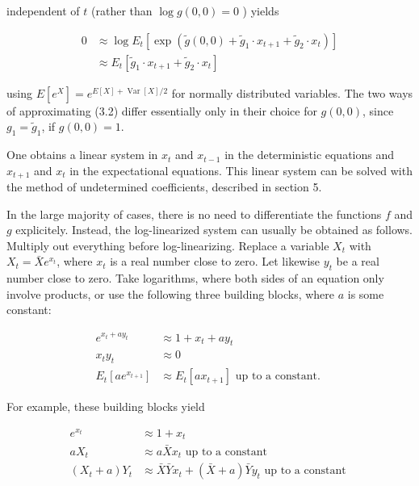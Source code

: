 \documentclass[10pt]{article}
\begin{document}
independent of $t$ (rather than $\log g(0,0)=0$ ) yields

\begin{equation*}
\begin{aligned}
0 & \approx \log E_{t}\left[\exp \left(\tilde{g}(0,0)+\tilde{g}_{1} \cdot x_{t+1}+\tilde{g}_{2} \cdot x_{t}\right)\right] \\
& \approx E_{t}\left[\tilde{g}_{1} \cdot x_{t+1}+\tilde{g}_{2} \cdot x_{t}\right]
\end{aligned}
\end{equation*}

using $E\left[e^{X}\right]=e^{E[X]+\operatorname{Var}[X] / 2}$ for normally distributed variables. The two ways of approximating (3.2) differ essentially only in their choice for $g(0,0)$, since $g_{1}=\tilde{g}_{1}$, if $g(0,0)=1$.

One obtains a linear system in $x_{t}$ and $x_{t-1}$ in the deterministic equations and $x_{t+1}$ and $x_{t}$ in the expectational equations. This linear system can be solved with the method of undetermined coefficients, described in section 5.

In the large majority of cases, there is no need to differentiate the functions $f$ and $g$ explicitely. Instead, the log-linearized system can usually be obtained as follows. Multiply out everything before log-linearizing. Replace a variable $X_{t}$ with $X_{t}=\bar{X} e^{x_{t}}$, where $x_{t}$ is a real number close to zero. Let likewise $y_{t}$ be a real number close to zero. Take logarithms, where both sides of an equation only involve products, or use the following three building blocks, where $a$ is some constant:

\begin{equation*}
\begin{aligned}
e^{x_{t}+a y_{t}} & \approx 1+x_{t}+a y_{t} \\
x_{t} y_{t} & \approx 0 \\
E_{t}\left[a e^{x_{t+1}}\right] & \approx E_{t}\left[a x_{t+1}\right] \text { up to a constant. }
\end{aligned}
\end{equation*}

For example, these building blocks yield

\begin{equation*}
\begin{aligned}
e^{x_{t}} & \approx 1+x_{t} \\
a X_{t} & \approx a \bar{X} x_{t} \text { up to a constant } \\
\left(X_{t}+a\right) Y_{t} & \approx \bar{X} \bar{Y} x_{t}+(\bar{X}+a) \bar{Y} y_{t} \text { up to a constant }
\end{aligned}
\end{equation*}
\end{document}
